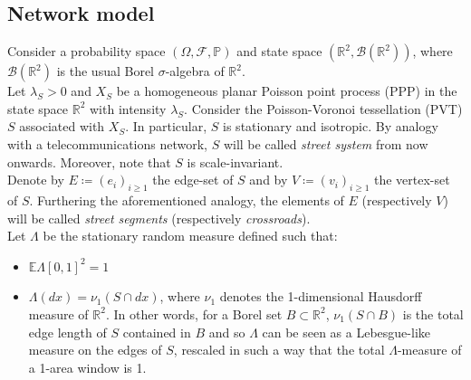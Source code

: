 \documentclass[10pt,a4paper]{amsart}
\theoremstyle{exampstyle}
\theoremstyle{exampnotations}
\begin{document}
\subsection{Network model}
\label{Ss.NetworkModel}
Consider a probability space $(\Omega, \mathcal{F}, \mathbb{P})$ and state space $(\mathbb{R}^{2}, \mathcal{B}(\mathbb{R}^{2}))$, where $\mathcal{B}(\mathbb{R}^{2})$ is the usual Borel $\sigma$-algebra of $\mathbb{R}^{2}$. \\

Let $\lambda_{S} > 0$ and $X_{S}$ be a homogeneous planar Poisson point process (PPP) in the state space $\mathbb{R}^{2}$ with intensity $\lambda_S$. Consider the Poisson-Voronoi tessellation (PVT) $S$ associated with $X_S$. In particular, $S$ is stationary and isotropic. By analogy with a telecommunications network, $S$ will be called \emph{street system} from now onwards. Moreover, note that $S$ is  scale-invariant. %
\\ \indent Denote by $E \coloneqq (e_{i})_{i \geq 1}$ the edge-set of $S$ and by $V \coloneqq (v_{i})_{i \geq 1}$ the vertex-set of $S$. Furthering the aforementioned analogy, the elements of $E$ (respectively $V$) will be called \emph{street segments} (respectively \emph{crossroads}). \\
\indent Let $\Lambda$ be the stationary random measure defined such that:
\begin{itemize}
\item $\mathbb{E} \Lambda \left[0,1\right]^{2} = 1$
\item $\Lambda(dx) = \nu_{1}(S \cap dx)$, where $\nu_{1}$ denotes the 1-dimensional Hausdorff measure of $\mathbb{R}^{2}$. In other words, for a Borel set $B \subset \mathbb{R}^2$, $\nu_{1}(S \cap B)$ is the total edge length of $S$ contained in  $B$ and so $\Lambda$ can be seen as a Lebesgue-like measure on the edges of $S$, rescaled in such a way that the total $\Lambda$-measure of a 1-area window is 1. \\
\end{itemize}
\end{document}
